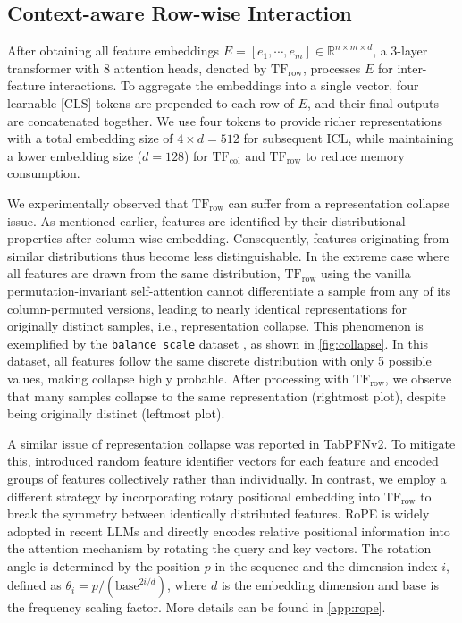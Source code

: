 \documentclass{article}
\theoremstyle{plain}
\theoremstyle{definition}
\theoremstyle{remark}
\newcommand{\TFcol}{\text{TF}_{\text{col}}}
\newcommand{\TFrow}{\text{TF}_{\text{row}}}
\begin{document}
\subsection{Context-aware Row-wise Interaction} \label{sec:tfrow}

After obtaining all feature embeddings \( E = [e_1, \cdots, e_m] \in \mathbb{R}^{n \times m \times d} \), a 3-layer transformer with 8 attention heads, denoted by $\TFrow$, processes \( E \) for inter-feature interactions. To aggregate the embeddings into a single vector, four learnable [CLS] tokens are prepended to each row of \( E \), and their final outputs are concatenated together. We use four tokens to provide richer representations with a total embedding size of $4 \times d = 512$ for subsequent ICL, while maintaining a lower embedding size ($d = 128$) for $\TFcol$ and $\TFrow$ to reduce memory consumption.

We experimentally observed that $\TFrow$ can suffer from a representation collapse issue. As mentioned earlier, features are identified by their distributional properties after column-wise embedding. Consequently, features originating from similar distributions thus become less distinguishable. In the extreme case where all features are drawn from the same distribution, $\TFrow$ using the vanilla permutation-invariant self-attention cannot differentiate a sample from any of its column-permuted versions, leading to nearly identical representations for originally distinct samples, i.e., representation collapse. This phenomenon is exemplified by the {\tt balance scale} dataset \cite{balance_scale_12}, as shown in \cref{fig:collapse}. In this dataset, all features follow the same discrete distribution with only 5 possible values, making collapse highly probable. After processing with $\TFrow$, we observe that many samples collapse to the same representation (rightmost plot), despite being originally distinct (leftmost plot).

A similar issue of representation collapse was reported in TabPFNv2. To mitigate this, \citet{hollmannAccuratePredictionsSmall2025} introduced random feature identifier vectors for each feature and encoded groups of features collectively rather than individually. In contrast, we employ a different strategy by incorporating rotary positional embedding \citep[RoPE,][]{suRoFormerEnhancedTransformer2023} into $\TFrow$ to break the symmetry between identically distributed features. RoPE is widely adopted in recent LLMs \citep{meta2024llama3} and directly encodes relative positional information into the attention mechanism by rotating the query and key vectors. The rotation angle is determined by the position $p$ in the sequence and the dimension index $i$, defined as \( \theta_{i} = p / ( \text{base}^{2i/d} ) \), where \(d\) is the embedding dimension and \(\text{base}\) is the frequency scaling factor. More details can be found in \cref{app:rope}.
\end{document}
